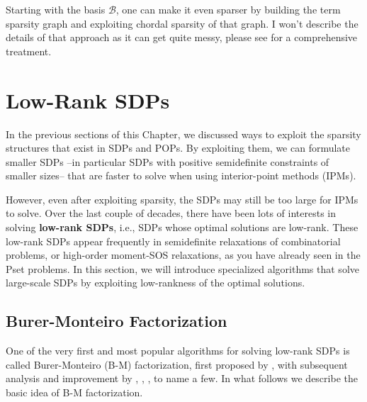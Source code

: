 \documentclass[
]{book}
\theoremstyle{definition}
\theoremstyle{definition}
\theoremstyle{definition}
\theoremstyle{definition}
\theoremstyle{remark}
\begin{document}
Starting with the basis \(\mathcal{B}\), one can make it even sparser by building the term sparsity graph and exploiting chordal sparsity of that graph. I won't describe the details of that approach as it can get quite messy, please see \citep{magron23book-sparse} for a comprehensive treatment.

\section{Low-Rank SDPs}\label{low-rank-sdps}

In the previous sections of this Chapter, we discussed ways to exploit the sparsity structures that exist in SDPs and POPs. By exploiting them, we can formulate smaller SDPs --in particular SDPs with positive semidefinite constraints of smaller sizes-- that are faster to solve when using interior-point methods (IPMs).

However, even after exploiting sparsity, the SDPs may still be too large for IPMs to solve. Over the last couple of decades, there have been lots of interests in solving \textbf{low-rank SDPs}, i.e., SDPs whose optimal solutions are low-rank. These low-rank SDPs appear frequently in semidefinite relaxations of combinatorial problems, or high-order moment-SOS relaxations, as you have already seen in the Pset problems. In this section, we will introduce specialized algorithms that solve large-scale SDPs by exploiting low-rankness of the optimal solutions.

\subsection{Burer-Monteiro Factorization}\label{burer-monteiro-factorization}

One of the very first and most popular algorithms for solving low-rank SDPs is called Burer-Monteiro (B-M) factorization, first proposed by \citep{burer03mp-nonlinear}, with subsequent analysis and improvement by \citep{journee10siopt-low}, \citep{boumal16nips-non}, \citep{cifuentes22nips-polynomial}, to name a few. In what follows we describe the basic idea of B-M factorization.
\end{document}
